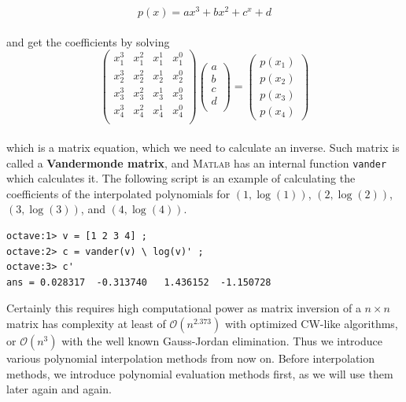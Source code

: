 \documentclass[paper=a4, fontsize=11pt]{scrartcl}
\newcommand{\MATLAB}{\textsc{Matlab}\xspace}
\begin{document}
\begin{equation}\nonumber
	p(x) = ax^3 + bx^2 + c^x + d 
\end{equation}\\

and get the coefficients by solving \\

\begin{equation}\nonumber
	\begin{pmatrix}
	x_1^3 & x_1^2 & x_1^1 & x_1^0 \\
	x_2^3 & x_2^2 & x_2^1 & x_2^0 \\
	x_3^3 & x_3^2 & x_3^1 & x_3^0 \\
	x_4^3 & x_4^2 & x_4^1 & x_4^0 \\
	\end{pmatrix}
	\begin{pmatrix}
	a \\ b\\ c \\ d\\
	\end{pmatrix}
	=
	\begin{pmatrix}
	p(x_1) \\ p(x_2) \\ p(x_3) \\ p(x_4)
	\end{pmatrix}
\end{equation}\\

which is a matrix equation, which we need to calculate an inverse. Such matrix is called a \textbf{Vandermonde matrix}, and \MATLAB has an internal function \texttt{vander} which calculates it. The following script is an example of calculating the coefficients of the interpolated polynomials for $(1,\log(1))$, $(2,\log(2))$, $(3,\log(3))$, and $(4,\log(4))$.

\begin{verbatim}
octave:1> v = [1 2 3 4] ;
octave:2> c = vander(v) \ log(v)' ;
octave:3> c'
ans = 0.028317  -0.313740   1.436152  -1.150728
\end{verbatim}

Certainly this requires high computational power as matrix inversion of a $n \times n$ matrix has complexity at least of $\mathcal{O}(n^{2.373})$ with optimized CW-like algorithms, or $\mathcal{O}(n^3)$ with the well known Gauss-Jordan elimination. Thus we introduce various polynomial interpolation methods from now on. Before interpolation methods, we introduce polynomial evaluation methods first, as we will use them later again and again.
\vspace{0.15in}
\end{document}
